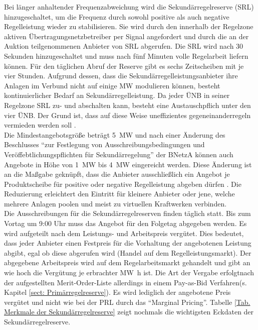 			Bei länger anhaltender Frequenzabweichung wird die Sekundärregelreserve (SRL) hinzugeschaltet, um die Frequenz durch sowohl positive als auch negative Regelleistung wieder zu stabilisieren.
			Sie wird durch den innerhalb der Regelzone aktiven Übertragungsnetzbetreiber per Signal angefordert und durch die an der Auktion teilgenommenen Anbieter von SRL abgerufen. 
			Die SRL wird nach \num{30} Sekunden hinzugeschaltet und muss nach fünf Minuten volle Regelarbeit liefern können. 
			Für den täglichen Abruf der Reserve gibt es sechs Zeitscheiben mit je vier Stunden.
			Aufgrund dessen, dass die Sekundärregelleistungsanbieter ihre Anlagen im Verbund nicht auf einige \si{\mega\watt} modulieren können, besteht kontinuierlicher Bedarf an Sekundärregelleistung.
			Da jeder ÜNB in seiner Regelzone SRL zu- und abschalten kann, besteht eine Austauschpflich unter den vier ÜNB.
			Der Grund ist, dass auf diese Weise uneffizientes gegeneinanderregeln vermieden werden soll \parencite{SRL_NextKraftwerke}. \\
			
			Die Mindestangebotsgröße beträgt \SI{5}{\mega\watt} und nach einer Änderung des Beschlusses "`zur Festlegung von Ausschreibungsbedingungen und Veröffebtlichungspflichten für Sekundärregelung"' der BNetzA können auch Angebote in Höhe von \SI{1}{\mega\watt} bis \SI{4}{\mega\watt} eingereicht werden.
			Diese Änderung ist an die Maßgabe geknüpft, dass die Anbieter ausschließlich ein Angebot je Produktscheibe für positive oder negative Regelleistung abgeben dürfen \parencite{Beschluss_SRL}.
			Die Reduzierung erleichtert den Eintritt für kleinere Anbieter oder jene, welche mehrere Anlagen poolen und meist zu virtuellen Kraftwerken verbinden. \\
			
			Die Ausschreibungen für die Sekundärregelreserven finden täglich statt. 
			Bis zum Vortag um 9:00 Uhr muss das Angebot für den Folgetag abgegeben werden.
			Es wird aufgeteilt nach dem Leistungs- und Arbeitspreis vergütet.
			Dies bedeutet, dass jeder Anbieter einen Festpreis für die Vorhaltung der angebotenen Leistung abgibt, egal ob diese abgerufen wird (Handel auf dem Regelleistungsmarkt).
			Der abgegebene Arbeitspreis wird auf dem Regelarbeitsmarkt gehandelt und gibt an wie hoch die Vergütung je erbrachter \si{\mega\watt\hour} ist.
			Die Art der Vergabe erfolgtnach der aufgestellten Merit-Order-Liste allerdings in einem Pay-as-Bid Verfahren(s. Kapitel \ref{sect: Primärregelreserve}).
			Es wird lediglich der angebotene Preis vergütet und nicht wie bei der PRL durch das "`Marginal Pricing"'.
			Tabelle \ref{Tab. Merkmale der Sekundärregelreserve} zeigt nochmals die wichtigsten Eckdaten der Sekundärregelreserve.
			
